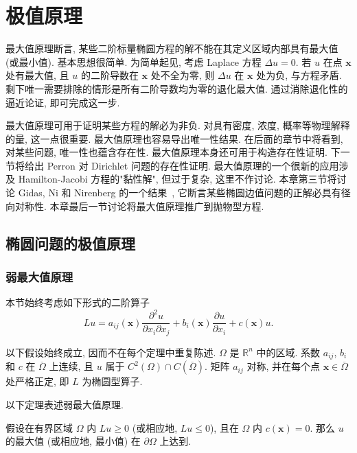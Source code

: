 \section{极值原理}\label{chap:maximum-principles}

最大值原理断言, 某些二阶标量椭圆方程的解不能在其定义区域内部具有最大值 (或最小值). 基本思想很简单. 为简单起见, 考虑 Laplace 方程 $\Delta u=0$. 若 $u$ 在点 $\bm{x}$ 处有最大值, 且 $u$ 的二阶导数在 $\bm{x}$ 处不全为零, 则 $\Delta u$ 在 $\bm{x}$ 处为负, 与方程矛盾. 剩下唯一需要排除的情形是所有二阶导数均为零的退化最大值. 通过消除退化性的逼近论证, 即可完成这一步.

最大值原理可用于证明某些方程的解必为非负. 对具有密度, 浓度, 概率等物理解释的量, 这一点很重要. 最大值原理也容易导出唯一性结果. 在后面的章节中将看到, 对某些问题, 唯一性也蕴含存在性. 最大值原理本身还可用于构造存在性证明. 下一节将给出 Perron 对 Dirichlet 问题的存在性证明. 最大值原理的一个很新的应用涉及 Hamilton-Jacobi 方程的"黏性解", 但过于复杂, 这里不作讨论. 本章第三节将讨论 Gidas, Ni 和 Nirenberg 的一个结果~\cite{GNN}, 它断言某些椭圆边值问题的正解必具有径向对称性. 本章最后一节讨论将最大值原理推广到抛物型方程.

\subsection{椭圆问题的极值原理}\label{sec:elliptic-maximum-principles}

\subsubsection{弱最大值原理}\label{subsec:weak-maximum-principle}

本节始终考虑如下形式的二阶算子
\begin{equation}\label{eq:elliptic-second-order-operator}
Lu=a_{ij}(\bm{x})\dfrac{\partial^2u}{\partial x_i\partial x_j}+b_i(\bm{x})\dfrac{\partial u}{\partial x_i}+c(\bm{x})u.
\end{equation}


以下假设始终成立, 因而不在每个定理中重复陈述. $\Omega$ 是 $\mathbb{R}^n$ 中的区域. 系数 $a_{ij}$, $b_i$ 和 $c$ 在 $\overline\Omega$ 上连续, 且 $u$ 属于 $C^2(\Omega)\cap C(\overline\Omega)$. 矩阵 $a_{ij}$ 对称, 并在每个点 $\bm{x}\in\overline\Omega$ 处严格正定, 即 $L$ 为椭圆型算子.

以下定理表述弱最大值原理.

\begin{Theorem}
\label{thm:weak-maximum-principle}
假设在有界区域 $\Omega$ 内 $Lu\geq0$ (或相应地, $Lu\leq0$), 且在 $\Omega$ 内 $c(\bm{x})=0$. 那么 $u$ 的最大值 (或相应地, 最小值) 在 $\partial\Omega$ 上达到.
\end{Theorem}

